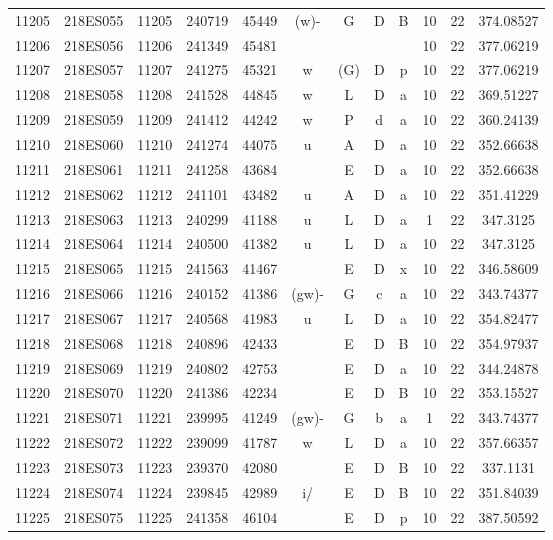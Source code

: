 \begin{tabular}{|*{12}{c|}}
11205 & 218ES055 & 11205 & 240719 & 45449 & (w)- & G & D & B & 10 & 22 & 374.08527 \\ 
11206 & 218ES056 & 11206 & 241349 & 45481 &  &  &  &  & 10 & 22 & 377.06219 \\ 
11207 & 218ES057 & 11207 & 241275 & 45321 & w & (G) & D & p & 10 & 22 & 377.06219 \\ 
11208 & 218ES058 & 11208 & 241528 & 44845 & w & L & D & a & 10 & 22 & 369.51227 \\ 
11209 & 218ES059 & 11209 & 241412 & 44242 & w & P & d & a & 10 & 22 & 360.24139 \\ 
11210 & 218ES060 & 11210 & 241274 & 44075 & u & A & D & a & 10 & 22 & 352.66638 \\ 
11211 & 218ES061 & 11211 & 241258 & 43684 &  & E & D & a & 10 & 22 & 352.66638 \\ 
11212 & 218ES062 & 11212 & 241101 & 43482 & u & A & D & a & 10 & 22 & 351.41229 \\ 
11213 & 218ES063 & 11213 & 240299 & 41188 & u & L & D & a & 1 & 22 & 347.3125 \\ 
11214 & 218ES064 & 11214 & 240500 & 41382 & u & L & D & a & 10 & 22 & 347.3125 \\ 
11215 & 218ES065 & 11215 & 241563 & 41467 &  & E & D & x & 10 & 22 & 346.58609 \\ 
11216 & 218ES066 & 11216 & 240152 & 41386 & (gw)- & G & c & a & 10 & 22 & 343.74377 \\ 
11217 & 218ES067 & 11217 & 240568 & 41983 & u & L & D & a & 10 & 22 & 354.82477 \\ 
11218 & 218ES068 & 11218 & 240896 & 42433 &  & E & D & B & 10 & 22 & 354.97937 \\ 
11219 & 218ES069 & 11219 & 240802 & 42753 &  & E & D & a & 10 & 22 & 344.24878 \\ 
11220 & 218ES070 & 11220 & 241386 & 42234 &  & E & D & B & 10 & 22 & 353.15527 \\ 
11221 & 218ES071 & 11221 & 239995 & 41249 & (gw)- & G & b & a & 1 & 22 & 343.74377 \\ 
11222 & 218ES072 & 11222 & 239099 & 41787 & w & L & D & a & 10 & 22 & 357.66357 \\ 
11223 & 218ES073 & 11223 & 239370 & 42080 &  & E & D & B & 10 & 22 & 337.1131 \\ 
11224 & 218ES074 & 11224 & 239845 & 42989 & i/ & E & D & B & 10 & 22 & 351.84039 \\ 
11225 & 218ES075 & 11225 & 241358 & 46104 &  & E & D & p & 10 & 22 & 387.50592 \\ 

\end{tabular}
